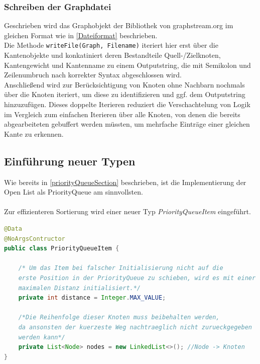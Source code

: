 \documentclass[a4paper]{article}
\begin{document}
\subsubsection{Schreiben der Graphdatei}
Geschrieben wird das Graphobjekt der Bibliothek von graphstream.org im gleichen Format wie in \ref{Dateiformat} beschrieben.\\
Die Methode \verb|writeFile(Graph, Filename)| iteriert hier erst über die Kantenobjekte und konkatiniert deren Bestandteile Quell-/Zielknoten, Kantengewicht und Kantenname zu einem Outputstring, die mit Semikolon und Zeilenumbruch nach korrekter Syntax abgeschlossen wird.\\
Anschließend wird zur Berücksichtigung von Knoten ohne Nachbarn nochmals über die Knoten iteriert, um diese zu identifizieren und ggf. dem Outputstring hinzuzufügen. Dieses doppelte Iterieren reduziert die Verschachtelung von Logik im Vergleich zum einfachen Iterieren über alle Knoten, von denen die bereits abgearbeiteten gebuffert werden müssten, um mehrfache Einträge einer gleichen
Kante zu erkennen.\\
		

\subsection{Einführung neuer Typen}

Wie bereits in \ref{priorityQueueSection} beschrieben, ist die Implementierung der Open List als PriorityQueue am sinnvollsten.\\\\
Zur effizienteren Sortierung wird einer neuer Typ \textit{PriorityQueueItem} eingeführt.\\

\begin{lstlisting}[language = java, frame = trBL]
@Data
@NoArgsContructor
public class PriorityQueueItem {

    /* Um das Item bei falscher Initialisierung nicht auf die
    erste Position in der PriorityQueue zu schieben, wird es mit einer
    maximalen Distanz initialisiert.*/
    private int distance = Integer.MAX_VALUE; 

    /*Die Reihenfolge dieser Knoten muss beibehalten werden,
    da ansonsten der kuerzeste Weg nachtraeglich nicht zurueckgegeben
    werden kann*/
    private List<Node> nodes = new LinkedList<>(); //Node -> Knoten
}
\end{lstlisting}

\newpage
\end{document}
